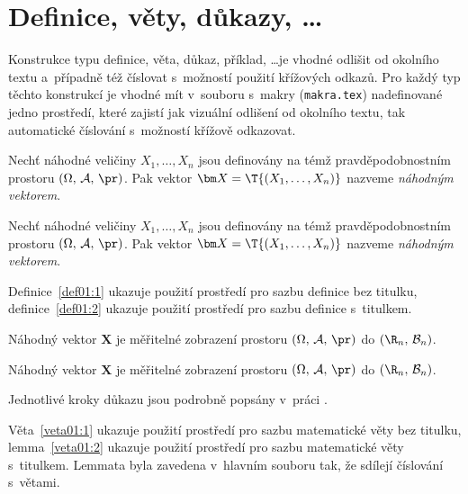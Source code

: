 \section{Definice, věty, důkazy, \dots}

Konstrukce typu definice, věta, důkaz, příklad, \dots je vhodné
odlišit od okolního textu a~případně též číslovat s~možností použití
křížových odkazů. Pro každý typ těchto konstrukcí je vhodné mít
v~souboru s~makry (\texttt{makra.tex}) nadefinované jedno prostředí,
které zajistí jak vizuální odlišení od okolního textu, tak
automatické číslování s~možností křížově odkazovat.

\begin{definice}\label{def01:1}
  Nechť náhodné veličiny $X_1,\dots,X_n$ jsou definovány na témž
  prav\-dě\-po\-dob\-nost\-ním prostoru $(\Omega,\,\mathcal{A},\,\pr)$. Pak
  vektor $\bm X = \T{(X_1,\dots,X_n)}$ nazveme \emph{náhodným
    vektorem}.
\end{definice}

\begin{definice}\label{def01:2}
  Nechť náhodné veličiny $X_1,\dots,X_n$ jsou definovány na témž
  pravděpodobnostním prostoru $(\Omega,\,\mathcal{A},\,\pr)$. Pak
  vektor $\bm X = \T{(X_1,\dots,X_n)}$ nazveme \emph{náhodným
    vektorem}.
\end{definice}
Definice~\ref{def01:1} ukazuje použití prostředí pro sazbu definice
bez titulku, definice~\ref{def01:2} ukazuje použití prostředí pro
sazbu definice s~titulkem.

\begin{veta}\label{veta01:1}
  Náhodný vektor $\bm X$ je měřitelné zobrazení prostoru
  $(\Omega,\,\mathcal{A},\,\pr)$ do $(\R_n,\,\mathcal{B}_n)$.
\end{veta}

\begin{lemma}\label{veta01:2}
  Náhodný vektor $\bm X$ je měřitelné zobrazení prostoru
  $(\Omega,\,\mathcal{A},\,\pr)$ do $(\R_n,\,\mathcal{B}_n)$.
\end{lemma}
\begin{dukaz}
  Jednotlivé kroky důkazu jsou podrobně popsány v~práci \citet[str.
  29]{Andel07}.
\end{dukaz}
Věta~\ref{veta01:1} ukazuje použití prostředí pro sazbu matematické
věty bez titulku, lemma~\ref{veta01:2} ukazuje použití prostředí pro
sazbu matematické věty s~titulkem. Lemmata byla zavedena v~hlavním
souboru tak, že sdílejí číslování s~větami.
 
